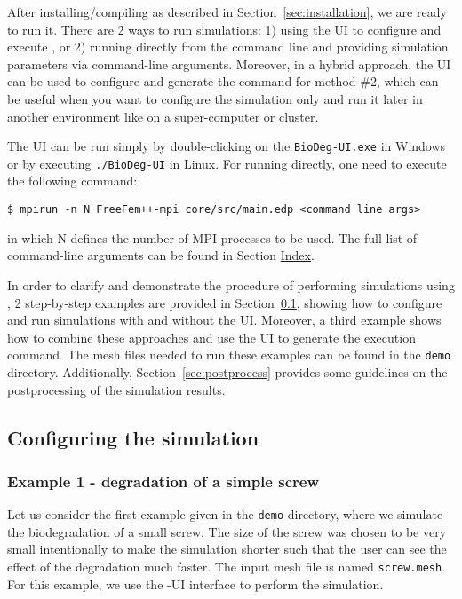 After installing/compiling \biodeg{} as described in Section~\ref{sec:installation}, we are ready to run it. There are 2 ways to run \biodeg{} simulations: 1) using the UI to configure and execute \biodeg{}, or 2) running \biodeg{} directly from the command line and providing simulation parameters via command-line arguments. Moreover, in a hybrid approach, the UI can be used to configure and generate the command for method \#2, which can be useful when you want to configure the simulation only and run it later in another environment like on a super-computer or cluster.

The UI can be run simply by double-clicking on the \verb|BioDeg-UI.exe| in Windows or by executing \verb|./BioDeg-UI| in Linux. For running \biodeg{} directly, one need to execute the following command:
\begin{verbatim}
$ mpirun -n N FreeFem++-mpi core/src/main.edp <command line args>
\end{verbatim}
in which N defines the number of MPI processes to be used. The full list of command-line arguments can be found in Section \hyperref[sec:index]{Index}.

In order to clarify and demonstrate the procedure of performing simulations using \biodeg{}, 2 step-by-step examples are provided in Section~\ref{sec:config}, showing how to configure and run simulations with and without the UI. Moreover, a third example shows how to combine these approaches and use the UI to generate the execution command. The mesh files needed to run these examples can be found in the \verb|demo| directory. Additionally, Section~\ref{sec:postprocess} provides some guidelines on the postprocessing of the  \biodeg{} simulation results. 

\subsection{Configuring the simulation} \label{sec:config}


\subsubsection{Example 1 - degradation of a simple screw}\label{sec:example1}

Let us consider the first example given in the \verb|demo| directory, where we simulate the biodegradation of a small screw. The size of the screw was chosen to be very small intentionally to make the simulation shorter such that the user can see the effect of the degradation much faster. The input mesh file is named \verb|screw.mesh|. For this example, we use the \biodeg{}-UI interface to perform the simulation. 

